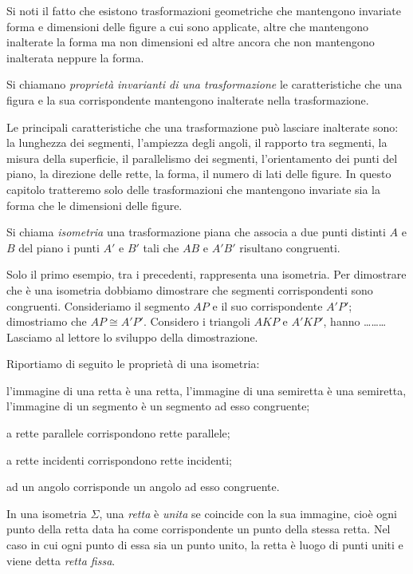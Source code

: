 Si noti il fatto che esistono trasformazioni geometriche che mantengono invariate forma e dimensioni delle figure a cui sono applicate, altre che mantengono inalterate la forma ma non dimensioni ed altre ancora che non mantengono inalterata neppure la forma.

\begin{definizione}
Si chiamano \emph{proprietà invarianti di una trasformazione} le caratteristiche che una figura e la sua corrispondente mantengono inalterate nella trasformazione.
\end{definizione}

Le principali caratteristiche che una trasformazione può lasciare inalterate sono: la lunghezza dei segmenti, l'ampiezza degli angoli, il rapporto tra segmenti, la misura della superficie, il parallelismo dei segmenti, l'orientamento dei punti del piano, la direzione delle rette, la forma, il numero di lati delle figure.
In questo capitolo tratteremo solo delle trasformazioni che mantengono invariate sia la forma che le dimensioni delle figure.

\begin{definizione}
Si chiama \emph{isometria} una trasformazione piana che associa a due punti distinti $A$ e $B$ del piano i punti $A'$ e $B'$ tali che $AB$ e $A'B'$ risultano congruenti.
\end{definizione}

Solo il primo esempio, tra i precedenti, rappresenta una isometria. Per dimostrare che è una isometria dobbiamo dimostrare che segmenti corrispondenti sono congruenti. Consideriamo il segmento $AP$ e il suo corrispondente $A'P'$; dimostriamo che $AP\cong A'P'$. Considero i triangoli $AKP$ e $A'KP'$, hanno \ldots\ldots\ldots{}
Lasciamo al lettore lo sviluppo della dimostrazione.

Riportiamo di seguito le proprietà di una isometria:
\begin{itemize*}
\item l'immagine di una retta è una retta, l'immagine di una semiretta è una semiretta, l'immagine di un segmento è un segmento ad esso congruente;
\item a rette parallele corrispondono rette parallele;
\item a rette incidenti corrispondono rette incidenti;
\item ad un angolo corrisponde un angolo ad esso congruente.
\end{itemize*}

\begin{definizione}
In una isometria $\Sigma$, una \emph{retta} è \emph{unita} se coincide con la sua immagine, cioè ogni punto della retta data ha come corrispondente un punto della stessa retta.
Nel caso in cui ogni punto di essa sia un punto unito, la retta è luogo di punti uniti e viene detta \emph{retta fissa}.
\end{definizione}

